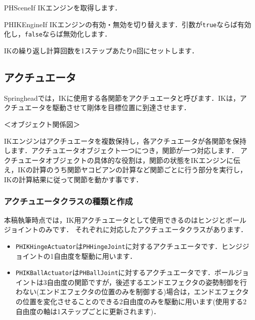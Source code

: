 
\begin{reference}{PHSceneIf}
IK\KLUDGE エンジンを取得します．
\end{reference}

\begin{reference}{PHIKEngineIf}
IK\KLUDGE エンジンの有効・無効を切り替えます．引数が\texttt{true}\KLUDGE ならば有効化し，\texttt{false}\KLUDGE ならば無効化します．

IK\KLUDGE の繰り返し計算回数を1\KLUDGE ステップあたり\texttt{n}\KLUDGE 回にセットします．
\end{reference}



\subsection*{\KLUDGE アクチュエータ}

Springhead\KLUDGE では，IK\KLUDGE に使用する各関節をアクチュエータと呼びます．IK\KLUDGE は，アクチュエータを駆動させて剛体を目標位置に到達させます．

\KLUDGE ＜オブジェクト関係図＞

IK\KLUDGE エンジンはアクチュエータを複数保持し，各アクチュエータが各関節を保持します．アクチュエータオブジェクト一つにつき，関節が一つ対応します．
\KLUDGE アクチュエータオブジェクトの具体的な役割は，関節の状態をIK\KLUDGE エンジンに伝え，IK\KLUDGE の計算のうち関節ヤコビアンの計算など関節ごとに行う部分を実行し，IK\KLUDGE の計算結果に従って関節を動かす事です．


\subsubsection*{\KLUDGE アクチュエータクラスの種類と作成}

\KLUDGE 本稿執筆時点では，IK\KLUDGE 用アクチュエータとして使用できるのはヒンジとボールジョイントのみです．
\KLUDGE それぞれに対応したアクチュエータクラスがあります．

\begin{itemize}
\item \texttt{PHIKHingeActuator}\KLUDGE は\texttt{PHHingeJoint}\KLUDGE に対するアクチュエータです．ヒンジジョイントの1\KLUDGE 自由度を駆動に用います．

\item \texttt{PHIKBallActuator}\KLUDGE は\texttt{PHBallJoint}\KLUDGE に対するアクチュエータです．ボールジョイントは3\KLUDGE 自由度の関節ですが，後述するエンドエフェクタの姿勢制御を行わない(\KLUDGE エンドエフェクタの位置のみを制御する)\KLUDGE 場合は，エンドエフェクタの位置を変化させることのできる2\KLUDGE 自由度のみを駆動に用います(\KLUDGE 使用する2\KLUDGE 自由度の軸は1\KLUDGE ステップごとに更新されます)\KLUDGE ．
\end{itemize}

